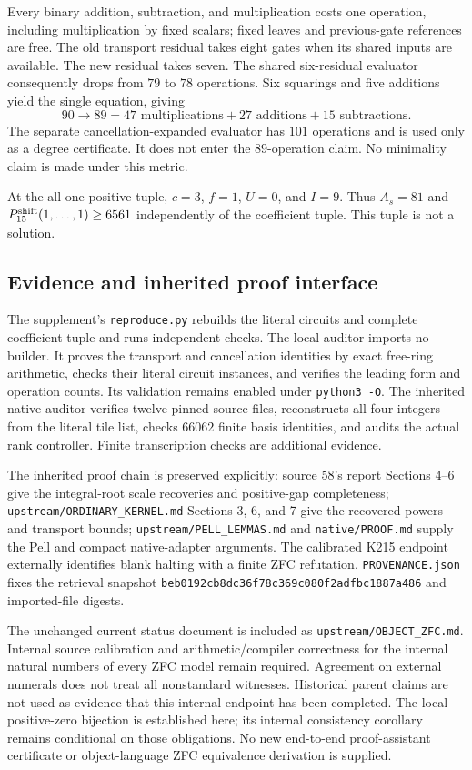 Every binary addition, subtraction, and multiplication costs one operation,
including multiplication by fixed scalars; fixed leaves and previous-gate
references are free. The old transport residual takes eight gates when its
shared inputs are available. The new residual takes seven. The shared
six-residual evaluator consequently drops from $79$ to $78$ operations.
Six squarings and five additions yield the single equation, giving
\[
 90\longrightarrow89
   =47\text{ multiplications}+27\text{ additions}+15\text{ subtractions}.
\]
The separate cancellation-expanded evaluator has $101$ operations and is
used only as a degree certificate. It does not enter the $89$-operation
claim. No minimality claim is made under this metric.

At the all-one positive tuple, $c=3$, $f=1$, $U=0$, and $I=9$. Thus
$A_s=81$ and $P_{15}^{\rm shift}(1,\ldots,1)\ge6561$ independently of the
coefficient tuple. This tuple is not a solution.

\subsection{Evidence and inherited proof interface}

The supplement's \texttt{reproduce.py} rebuilds the literal circuits and
complete coefficient tuple and runs independent checks. The local auditor
imports no builder. It proves the transport and cancellation identities
by exact free-ring arithmetic, checks their literal circuit instances,
and verifies the leading form and operation counts. Its validation remains
enabled under \texttt{python3 -O}. The inherited native auditor verifies
twelve pinned source files, reconstructs all four integers from the literal
tile list, checks $66062$ finite basis identities, and audits the actual
rank controller. Finite transcription checks are additional evidence.

The inherited proof chain is preserved explicitly: source 58's report
Sections 4--6 give the integral-root scale recoveries and positive-gap
completeness; \texttt{upstream/ORDINARY\_KERNEL.md} Sections 3, 6, and 7
give the recovered powers and transport bounds;
\texttt{upstream/PELL\_LEMMAS.md} and \texttt{native/PROOF.md} supply the
Pell and compact native-adapter arguments. The calibrated K215 endpoint
externally identifies blank halting with a finite ZFC refutation.
\texttt{PROVENANCE.json} fixes the retrieval snapshot
\texttt{beb0192cb8dc36f78c369c080f2adfbc1887a486} and imported-file digests.

The unchanged current status document is included as
\texttt{upstream/OBJECT\_ZFC.md}. Internal source calibration and
arithmetic/compiler correctness for the internal natural numbers of every
ZFC model remain required. Agreement on external numerals does not treat
all nonstandard witnesses. Historical parent claims are not used as
evidence that this internal endpoint has been completed. The local
positive-zero bijection is established here; its internal consistency
corollary remains conditional on those obligations. No new end-to-end
proof-assistant certificate or object-language ZFC equivalence derivation
is supplied.

